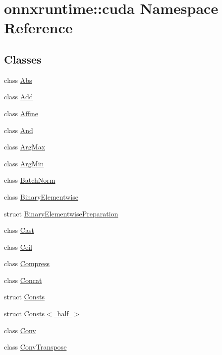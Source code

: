 \hypertarget{namespaceonnxruntime_1_1cuda}{}\section{onnxruntime\+:\+:cuda Namespace Reference}
\label{namespaceonnxruntime_1_1cuda}
\subsection*{Classes}
\begin{DoxyCompactItemize}
\item 
class \mbox{\hyperlink{classonnxruntime_1_1cuda_1_1Abs}{Abs}}
\item 
class \mbox{\hyperlink{classonnxruntime_1_1cuda_1_1Add}{Add}}
\item 
class \mbox{\hyperlink{classonnxruntime_1_1cuda_1_1Affine}{Affine}}
\item 
class \mbox{\hyperlink{classonnxruntime_1_1cuda_1_1And}{And}}
\item 
class \mbox{\hyperlink{classonnxruntime_1_1cuda_1_1ArgMax}{Arg\+Max}}
\item 
class \mbox{\hyperlink{classonnxruntime_1_1cuda_1_1ArgMin}{Arg\+Min}}
\item 
class \mbox{\hyperlink{classonnxruntime_1_1cuda_1_1BatchNorm}{Batch\+Norm}}
\item 
class \mbox{\hyperlink{classonnxruntime_1_1cuda_1_1BinaryElementwise}{Binary\+Elementwise}}
\item 
struct \mbox{\hyperlink{structonnxruntime_1_1cuda_1_1BinaryElementwisePreparation}{Binary\+Elementwise\+Preparation}}
\item 
class \mbox{\hyperlink{classonnxruntime_1_1cuda_1_1Cast}{Cast}}
\item 
class \mbox{\hyperlink{classonnxruntime_1_1cuda_1_1Ceil}{Ceil}}
\item 
class \mbox{\hyperlink{classonnxruntime_1_1cuda_1_1Compress}{Compress}}
\item 
class \mbox{\hyperlink{classonnxruntime_1_1cuda_1_1Concat}{Concat}}
\item 
struct \mbox{\hyperlink{structonnxruntime_1_1cuda_1_1Consts}{Consts}}
\item 
struct \mbox{\hyperlink{structonnxruntime_1_1cuda_1_1Consts_3_01half_01_4}{Consts$<$ half $>$}}
\item 
class \mbox{\hyperlink{classonnxruntime_1_1cuda_1_1Conv}{Conv}}
\item 
class \mbox{\hyperlink{classonnxruntime_1_1cuda_1_1ConvTranspose}{Conv\+Transpose}}

\end{DoxyCompactItemize}
